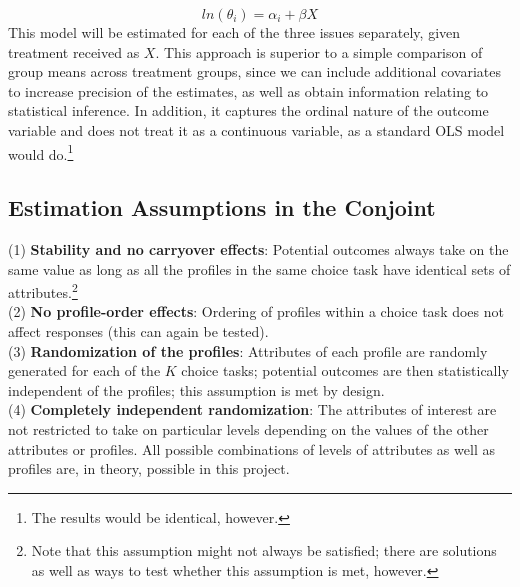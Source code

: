 \documentclass[11pt]{article}
\begin{document}
\begin{equation*}
ln(\theta_i) = \alpha_i + \beta X
\end{equation*}
This model will be estimated for each of the three issues separately, given treatment received as $X$. This approach is superior to a simple comparison of group means across treatment groups, since we can include additional covariates to increase precision of the estimates, as well as obtain information relating to statistical inference. In addition, it captures the ordinal nature of the outcome variable and does not treat it as a continuous variable, as a standard OLS model would do.\footnote{The results would be identical, however.}

\subsection{Estimation Assumptions in the Conjoint}
(1) \textbf{Stability and no carryover effects}: Potential outcomes always take on the same value as long as all the profiles in the same choice task have identical sets of attributes.\footnote{Note that this assumption might not always be satisfied; there are solutions as well as ways to test whether this assumption is met, however.}\\
(2) \textbf{No profile-order effects}: Ordering of profiles within a choice task does not affect responses (this can again be tested).\\
(3) \textbf{Randomization of the profiles}: Attributes of each profile are randomly generated for each of the $K$ choice tasks; potential outcomes are then statistically independent of the profiles; this assumption is met by design.\\
(4) \textbf{Completely independent randomization}: The attributes of interest are not restricted to take on particular levels depending on the values of the other attributes or profiles. All possible combinations of levels of attributes as well as profiles are, in theory, possible in this project.
\end{document}
